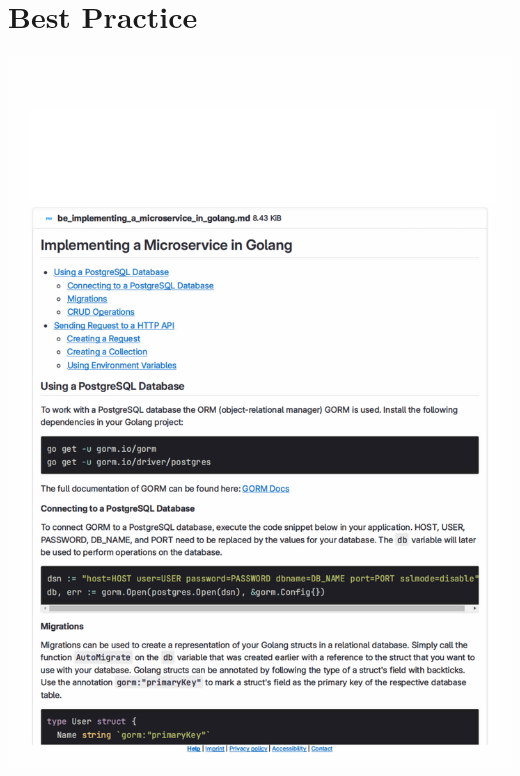 \section{Best Practice}

\includegraphics[height=\textheight]{pdfs/ume_be_implementing_a_microservice_in_golang.pdf}



%
%
\makeatletter
\renewenvironment{thebibliography}[1]
     {\section{\bibname}
      \list{\@biblabel{\@arabic\c@enumiv}}
           {\settowidth\labelwidth{\@biblabel{#1}}
            \leftmargin\labelwidth
            \advance\leftmargin\labelsep
            \@openbib@code
            \usecounter{enumiv}%
            \let\p@enumiv\@empty
            \renewcommand\theenumiv{\@arabic\c@enumiv}}
      \sloppy
      \clubpenalty4000
      \@clubpenalty \clubpenalty
      \widowpenalty4000
      \sfcode`\.\@m}
     {\def\@noitemerr
       {\@latex@warning{Empty `thebibliography' environment}}%
      \endlist}
\makeatother



